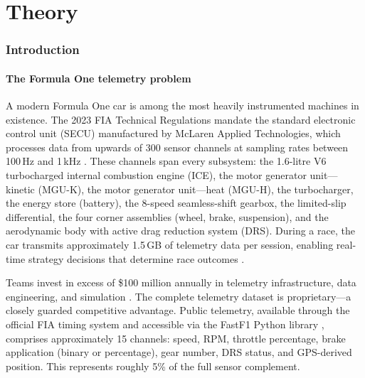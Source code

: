 \documentclass[twocolumn,10pt,a4paper]{article}
\theoremstyle{definition}
\theoremstyle{remark}
\begin{document}

\part{Theory}\label{part:theory}

\section{Introduction}\label{sec:introduction}

\subsection{The Formula One telemetry problem}

A modern Formula One car is among the most heavily instrumented machines in existence. The 2023 FIA Technical Regulations mandate the standard electronic control unit (SECU) manufactured by McLaren Applied Technologies, which processes data from upwards of 300 sensor channels at sampling rates between 100\,Hz and 1\,kHz \citep{FIA2023}. These channels span every subsystem: the 1.6-litre V6 turbocharged internal combustion engine (ICE), the motor generator unit---kinetic (MGU-K), the motor generator unit---heat (MGU-H), the turbocharger, the energy store (battery), the 8-speed seamless-shift gearbox, the limited-slip differential, the four corner assemblies (wheel, brake, suspension), and the aerodynamic body with active drag reduction system (DRS). During a race, the car transmits approximately 1.5\,GB of telemetry data per session, enabling real-time strategy decisions that determine race outcomes \citep{Koutrik2014, Heilmeier2020}.

Teams invest in excess of \$100 million annually in telemetry infrastructure, data engineering, and simulation \citep{Heilmeier2020}. The complete telemetry dataset is proprietary---a closely guarded competitive advantage. Public telemetry, available through the official FIA timing system and accessible via the FastF1 Python library \citep{Theelke2023}, comprises approximately 15 channels: speed, RPM, throttle percentage, brake application (binary or percentage), gear number, DRS status, and GPS-derived position. This represents roughly 5\% of the full sensor complement.
\end{document}
